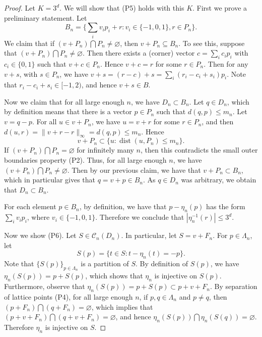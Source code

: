 \documentclass[12pt]{amsart}
\theoremstyle{definition}
\DeclareMathOperator{\dist}{dist}
\begin{document}
\begin{proof}
Let $K = 3^d$. We will show that (P5) holds with this $K$. First we prove a preliminary statement. Let
\begin{equation*}
B_n = \biggl\{ \sum_i v_i p_i + r : v_i \in \{-1,0,1\}, r \in P_n \biggr\}.
\end{equation*}
We claim that if $(v+P_n) \bigcap P_n \neq \varnothing$, then $v + P_n \subseteq B_n$. To see this, suppose that $(v+P_n) \bigcap P_n \neq \varnothing$. Then there exists a (corner) vector $c = \sum_i c_i p_i$ with $c_i \in \{0,1\}$ such that $v+c \in P_n$. Hence $v+c = r$ for some $r \in P_n$. Then for any $v+s$, with $s \in P_n$, we have $v+s = (r-c)+s = \sum_i (r_i - c_i + s_i)p_i$. Note that $r_i - c_i+s_i \in [-1,2)$, and hence $v +s \in B$.

Now we claim that for all large enough $n$, we have $D_n \subset B_n$. Let $q \in D_n$, which by definition means that there is a vector $p \in P_n$ such that $d(q,p) \leq m_n$. Let $v = q-p$. For all $u \in v + P_n$, we have $u = v+r$ for some $r \in P_n$, and then $d(u,r) = \| v+r - r\|_{\infty} = d(q,p) \leq m_n$. Hence 
\begin{equation*}
v+P_n \subset \biggl\{ u : \dist(u,P_n) \leq m_n \biggr\}.
\end{equation*}
If $(v+P_n) \bigcap P_n = \varnothing$ for infinitely many $n$, then this contradicts the small outer boundaries property (P2). Thus, for all large enough $n$, we have $(v+P_n) \bigcap P_n \neq \varnothing$. Then by our previous claim, we have that $v+P_n \subset B_n$, which in particular gives that $q = v+p \in B_n$. As $q \in D_n$ was arbitrary, we obtain that $D_n \subset B_n$.

For each element $p \in B_n$, by definition, we have that $p-\eta_n(p)$ has the form $\sum_i v_i p_i$, where $v_i \in \{-1,0,1\}$. Therefore we conclude that $|\eta_n^{-1}(r)| \leq 3^d$.

Now we show (P6). 
Let $S \in \mathcal{C}_n(D_n)$. In particular, let $S = v + F_n$. 
For $p \in \Lambda_n$, let
\begin{equation*}
S(p) = \bigl\{ t \in S : t - \eta_n(t) = -p \bigr\}.
\end{equation*}
Note that $\{S(p)\}_{p \in \Lambda_n}$ is a partition of $S$. By definition of $S(p)$, we have $\eta_n(S(p)) = p + S(p)$, which shows that $\eta_n$ is injective on $S(p)$. Furthermore,  observe that $\eta_n(S(p)) = p+S(p) \subset p + v +F_n$.  By separation of lattice points (P4), for all large enough $n$, if $p,q \in \Lambda_n$ and $p \neq q$, then $(p+F_n) \bigcap (q + F_n) = \varnothing$, which implies that $(p + v + F_n) \bigcap (q + v + F_n) = \varnothing$, and hence $\eta_n(S(p)) \bigcap \eta_n(S(q)) = \varnothing$. Therefore $\eta_n$ is injective on $S$.
\end{proof}
\end{document}
